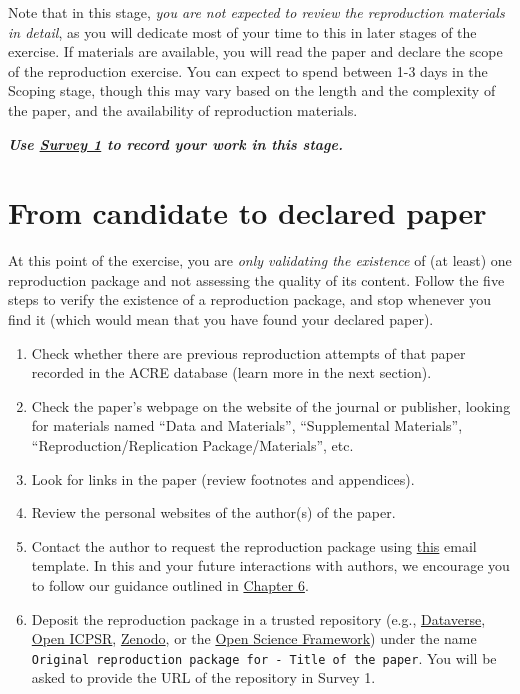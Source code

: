 \documentclass[]{book}
\providecommand{\tightlist}{%
  \setlength{\itemsep}{0pt}\setlength{\parskip}{0pt}}
\begin{document}
Note that in this stage, \emph{you are not expected to review the reproduction materials in detail}, as you will dedicate most of your time to this in later stages of the exercise. If materials are available, you will read the paper and declare the scope of the reproduction exercise. You can expect to spend between 1-3 days in the Scoping stage, though this may vary based on the length and the complexity of the paper, and the availability of reproduction materials.

\textbf{\emph{Use \href{https://berkeley.qualtrics.com/jfe/form/SV_2bO83uJvU9ZiTXv}{Survey 1} to record your work in this stage.}}

\hypertarget{from-candidate-to-declared-paper}{%
\section{From candidate to declared paper}\label{from-candidate-to-declared-paper}}

At this point of the exercise, you are \emph{only validating the existence} of (at least) one reproduction package and not assessing the quality of its content. Follow the five steps to verify the existence of a reproduction package, and stop whenever you find it (which would mean that you have found your declared paper).

\begin{enumerate}
\def\labelenumi{\arabic{enumi}.}
\tightlist
\item
  Check whether there are previous reproduction attempts of that paper recorded in the ACRE database (learn more in the next section).
\item
  Check the paper's webpage on the website of the journal or publisher, looking for materials named ``Data and Materials'', ``Supplemental Materials'', ``Reproduction/Replication Package/Materials'', etc.\\
\item
  Look for links in the paper (review footnotes and appendices).\\
\item
  Review the personal websites of the author(s) of the paper.
\item
  Contact the author to request the reproduction package using \href{https://bitss.github.io/ACRE/guidance-for-a-constructive-exchange-between-reproducers-and-original-authors.html\#contacting-the-original-authors-when-there-is-no-reproduction-package}{this} email template. In this and your future interactions with authors, we encourage you to follow our guidance outlined in \href{https://bitss.github.io/ACRE/guidance-for-a-constructive-exchange-between-reproducers-and-original-authors.html\#contacting-the-original-authors-when-there-is-no-reproduction-package}{Chapter 6}.
\item
  Deposit the reproduction package in a trusted repository (e.g., \href{https://dataverse.org/}{Dataverse}, \href{https://www.openicpsr.org/openicpsr/}{Open ICPSR}, \href{https://zenodo.org/}{Zenodo}, or the \href{https://osf.io/}{Open Science Framework}) under the name \texttt{Original\ reproduction\ package\ for\ -\ Title\ of\ the\ paper}. You will be asked to provide the URL of the repository in Survey 1.
\end{enumerate}
\end{document}
